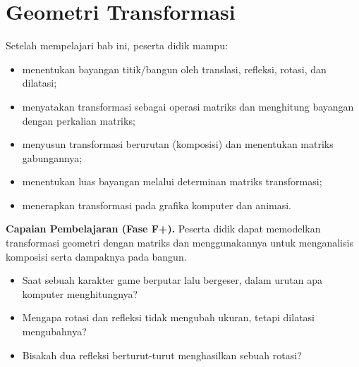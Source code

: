 \documentclass[11pt,a4paper]{report}
\theoremstyle{gaya}
\begin{document}
\chapter{Geometri Transformasi}
\begin{tujuan}
Setelah mempelajari bab ini, peserta didik mampu:
\begin{itemize}[leftmargin=*,topsep=2pt]
  \item menentukan bayangan titik/bangun oleh translasi, refleksi, rotasi, dan dilatasi;
  \item menyatakan transformasi sebagai operasi matriks dan menghitung bayangan dengan perkalian matriks;
  \item menyusun transformasi berurutan (komposisi) dan menentukan matriks gabungannya;
  \item menentukan luas bayangan melalui determinan matriks transformasi;
  \item menerapkan transformasi pada grafika komputer dan animasi.
\end{itemize}
\textbf{Capaian Pembelajaran (Fase F+).} Peserta didik dapat memodelkan transformasi geometri dengan matriks dan menggunakannya untuk menganalisis komposisi serta dampaknya pada bangun.
\end{tujuan}

\begin{pemantik}
\begin{itemize}[leftmargin=*,topsep=2pt]
  \item Saat sebuah karakter game berputar lalu bergeser, dalam urutan apa komputer menghitungnya?
  \item Mengapa rotasi dan refleksi tidak mengubah ukuran, tetapi dilatasi mengubahnya?
  \item Bisakah dua refleksi berturut-turut menghasilkan sebuah rotasi?
\end{itemize}
\end{pemantik}
\end{document}
